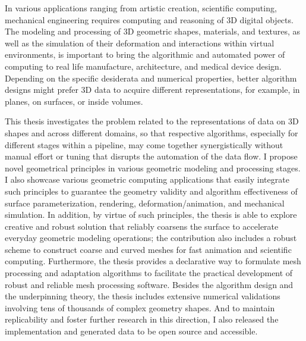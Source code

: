 In various applications ranging from artistic creation, scientific computing, mechanical engineering requires computing and reasoning of 3D digital objects.
The modeling and processing of 3D geometric shapes, materials, and textures, as well as the simulation of their deformation and interactions within virtual environments, is important to bring the algorithmic and automated power of computing to real life manufacture, architecture, and medical device design.
Depending on the specific desiderata and numerical properties, better algorithm designs might prefer 3D data to acquire different representations, for example, in planes, on surfaces, or inside volumes.

This thesis investigates the problem related to the representations of data on 3D shapes and across different domains,
so that respective algorithms, especially for different stages within a pipeline, may come together synergistically without manual effort or tuning that disrupts the automation of the data flow.
I propose novel geometrical principles in various geometric modeling and processing stages. 
I also showcase various geometric computing applications that easily integrate such principles to guarantee the geometry validity and algorithm effectiveness of surface parameterization, rendering, deformation/animation, and mechanical simulation.
In addition, by virtue of such principles, the thesis is able to explore creative and robust solution that reliably coarsens the surface to accelerate everyday geometric modeling operations; the contribution also includes a robust scheme to construct coarse and curved meshes for fast animation and scientific computing.
Furthermore, the thesis provides a declarative way to formulate mesh processing and adaptation algorithms to facilitate the practical development of robust and reliable mesh processing software.
Besides the algorithm design and the underpinning theory, the thesis includes extensive numerical validations involving tens of thousands of complex geometry shapes. And to maintain replicability and foster further research in this direction, I also released the implementation and generated data to be open source and accessible.
